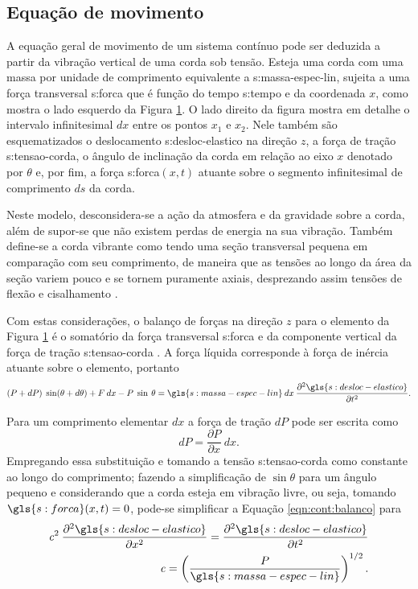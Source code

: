 \documentclass[12pt,oneside,english,brazil,lmodern,siglas,simbolos,cite=num]{ucsmonograph}
\begin{document}
	\subsection{Equação de movimento}
	A equação geral de movimento de um sistema contínuo pode ser deduzida a partir da vibração vertical de uma corda sob tensão.
	Esteja uma corda com uma massa por unidade de comprimento equivalente a \gls{s:massa-espec-lin}, sujeita a uma força transversal \gls{s:forca} que é função do tempo \gls{s:tempo} e da coordenada $x$, como mostra o lado esquerdo da Figura \ref{fig:vibracao-corda}.
	O lado direito da figura mostra em detalhe o intervalo infinitesimal $dx$ entre os pontos $x_1$ e $x_2$.
	Nele também são esquematizados o deslocamento \gls{s:desloc-elastico} na direção $z$, a força de tração \gls{s:tensao-corda}, o ângulo de inclinação da corda em relação ao eixo $x$ denotado por $ \theta $ e, por fim, a força \gls{s:forca}$(x,t)$ atuante sobre o segmento infinitesimal de comprimento $ds$ da corda.
	\begin{figure}[t] 
	 \label{fig:vibracao-corda}
	\end{figure}

	Neste modelo, desconsidera-se a ação da atmosfera e da gravidade sobre a corda, além de supor-se que não existem perdas de energia na sua vibração.
	Também define-se a corda vibrante como tendo uma seção transversal pequena em comparação com seu comprimento, de maneira que as tensões ao longo da área da seção variem pouco e se tornem puramente axiais, desprezando assim tensões de flexão e cisalhamento \cite{clark:1972}.
	
	Com estas considerações, o balanço de forças na direção $z$ para o elemento da Figura \ref{fig:vibracao-corda} é o somatório da força transversal \gls{s:forca} e da componente vertical da força de tração \gls{s:tensao-corda} \cite{rao:2008}.
	A força líquida corresponde à força de inércia atuante sobre o elemento, portanto
	\begin{equation} \label{eqn:cont:balanco}
		(P + dP)\;\sin(\theta + d\theta) + F\:dx - P\;\sin\:\theta =
		\gls{s:massa-espec-lin}\:dx\:\frac{\partial^2 \gls{s:desloc-elastico}}
		{\partial t^2}.
	\end{equation}
	
	Para um comprimento elementar $dx$ a força de tração $dP$ pode ser escrita como \[dP = \frac{\partial P}{\partial x}\:dx.\] 
	Empregando essa substituição e tomando a tensão \gls{s:tensao-corda} como constante ao longo do comprimento; fazendo a simplificação de $\sin\theta$ para um ângulo pequeno e considerando que a corda esteja em vibração livre, ou seja, tomando $\gls{s:forca}(x,t) = 0$, pode-se simplificar a Equação \ref{eqn:cont:balanco} para
	\begin{align}
		\mathit{c}^2\:\frac{\partial^2
		\gls{s:desloc-elastico}}{\partial x^2}=\frac{\partial^2
		\gls{s:desloc-elastico}}{\partial t^2} \label{eqn:cont:onda}\\
		\mathit{c} = \left(\frac{P}{\gls{s:massa-espec-lin}}\right)^{1/2}.
	\end{align}
	
\end{document}
